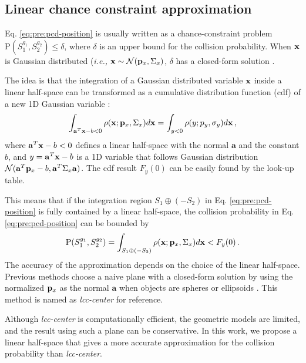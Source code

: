 \documentclass[conference]{IEEEtran}
\newcommand{\xx}{{\bf x}}
\newcommand{\pp}{{\bf p}}
\newcommand{\ie}{{\it i.e.,}}
\newcommand{\PP}{\text{P}}
\begin{document}
\subsection{Linear chance constraint approximation}

Eq. \ref{eq:pre:pcd-position} is usually written as a chance-constraint problem $\PP(S_1^{g_1}, S_2^{g_2}) \leq \delta$,
where $\delta$ is an upper bound for the collision probability. When $\xx$ is Gaussian distributed (\ie{ $\xx \sim \mathcal{N}(\pp_x, \Sigma_x)$}, $\delta$ has a closed-form solution \cite{blackmore2011chance}.

The idea is that the integration of a Gaussian distributed variable $\xx$ inside a linear half-space can be transformed as a cumulative distribution function (cdf) of a new 1D Gaussian variable \cite{blackmore2011chance}:
\begin{equation*}
\int_{\mathbf{a}^T\xx-b<0} \rho(\xx; \pp_x, \Sigma_x) d\xx = \int_{y<0} \rho(y; p_y, \sigma_y) d\xx \, ,
\end{equation*}
where $\mathbf{a}^T\xx-b<0$ defines a linear half-space with the normal $\mathbf{a}$ and the constant $b$, and $y=\mathbf{a}^T\xx-b$ is a 1D variable that follows Gaussian distribution $\mathcal{N}(\mathbf{a}^T\pp_x-b, \mathbf{a}^T\Sigma_x\mathbf{a})$. The cdf result $F_y(0)$ can be easily found by the look-up table. 

This means that if the integration region $S_1\oplus(-S_2)$ in Eq. \ref{eq:pre:pcd-position} is fully contained by a linear half-space, the collision probability in Eq. \ref{eq:pre:pcd-position} can be bounded by
\begin{equation}
\label{eq:pre:linear-chance-constraint-approximation}
\PP(S_1^{g_1}, S_2^{g_2}) = \int_{S_1\oplus(-S_2)} \rho(\xx; \pp_x, \Sigma_x) d\xx < F_y(0) \, .
\end{equation}
The accuracy of the approximation depends on the choice of the linear half-space. Previous methods choose a naive plane with a closed-form solution by using the normalized $\pp_x$ as the normal $\mathbf{a}$ when objects are spheres or ellipsoids \cite{zhu2019chance, liu2023tight}. This method is named as \textit{lcc-center} for reference. 

Although \textit{lcc-center} is computationally efficient, the geometric models are limited, and the result using such a plane can be conservative. In this work, we propose a linear half-space that gives a more accurate approximation for the collision probability than \textit{lcc-center}. 
\end{document}
